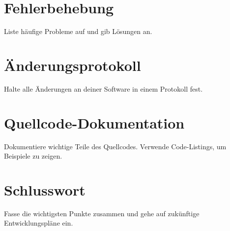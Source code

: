 \documentclass[a4paper, 12pt]{article}
\begin{document}
    \section{Fehlerbehebung}
    Liste häufige Probleme auf und gib Lösungen an.

    \section{Änderungsprotokoll}
    Halte alle Änderungen an deiner Software in einem Protokoll fest.

    \section{Quellcode-Dokumentation}
    Dokumentiere wichtige Teile des Quellcodes. Verwende Code-Listings, um Beispiele zu zeigen.

    \section{Schlusswort}
    Fasse die wichtigsten Punkte zusammen und gehe auf zukünftige Entwicklungspläne ein.
\end{document}

